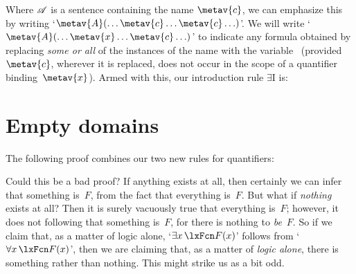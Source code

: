Where $\mathscr{A}$ is a sentence containing the name $\metav{c}$, we
can emphasize this by writing `$\metav{A}(\ldots \metav{c} \ldots
\metav{c}\ldots)$'. We will write `$\metav{A}(\ldots \metav{x} \ldots
\metav{c}\ldots)$' to indicate any formula obtained by replacing
\emph{some or all} of the instances of the name  with the
variable~ (provided~$\metav{c}$, wherever it is
replaced, does not occur in the scope of a quantifier
binding~$\metav{x}$). Armed with this, our introduction rule
$\exists$I is:

\section{Empty domains}
The following proof combines our two new rules for quantifiers:
	\begin{fitchproof}
		\PR
	\end{fitchproof}
Could this be a bad proof? If anything exists at all, then certainly we can infer that something is~$F$, from the fact that everything is~$F$. But what if \emph{nothing} exists at all? Then it is surely vacuously true that everything is~$F$; however, it does not following that something is~$F$, for there is nothing to \emph{be}~$F$. So if we claim that, as a matter of logic alone, `$\exists x\,\atom{F}{x}$' follows from `$\forall x\,\atom{F}{x}$', then we are claiming that, as a matter of \emph{logic alone}, there is something rather than nothing. This might strike us as a bit odd.

